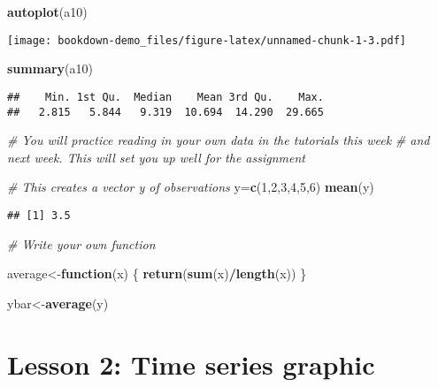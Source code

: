 \documentclass[]{book}
\newenvironment{Shaded}{\begin{snugshade}}{\end{snugshade}}
\newcommand{\CommentTok}[1]{\textcolor[rgb]{0.56,0.35,0.01}{\textit{#1}}}
\newcommand{\ControlFlowTok}[1]{\textcolor[rgb]{0.13,0.29,0.53}{\textbf{#1}}}
\newcommand{\DecValTok}[1]{\textcolor[rgb]{0.00,0.00,0.81}{#1}}
\newcommand{\KeywordTok}[1]{\textcolor[rgb]{0.13,0.29,0.53}{\textbf{#1}}}
\newcommand{\NormalTok}[1]{#1}
\newcommand{\OperatorTok}[1]{\textcolor[rgb]{0.81,0.36,0.00}{\textbf{#1}}}
\begin{document}
\begin{Shaded}
\begin{Highlighting}[]
\KeywordTok{autoplot}\NormalTok{(a10)}
\end{Highlighting}
\end{Shaded}

\texttt{[image: bookdown-demo\_files/figure-latex/unnamed-chunk-1-3.pdf]}

\begin{Shaded}
\begin{Highlighting}[]
\KeywordTok{summary}\NormalTok{(a10)}
\end{Highlighting}
\end{Shaded}

\begin{verbatim}
##    Min. 1st Qu.  Median    Mean 3rd Qu.    Max. 
##   2.815   5.844   9.319  10.694  14.290  29.665
\end{verbatim}

\begin{Shaded}
\begin{Highlighting}[]
\CommentTok{# You will practice reading in your own data in the tutorials this week}
\CommentTok{# and next week. This will set you up well for the assignment}

\CommentTok{# This creates a vector y of observations}
\NormalTok{y=}\KeywordTok{c}\NormalTok{(}\DecValTok{1}\NormalTok{,}\DecValTok{2}\NormalTok{,}\DecValTok{3}\NormalTok{,}\DecValTok{4}\NormalTok{,}\DecValTok{5}\NormalTok{,}\DecValTok{6}\NormalTok{)}
\KeywordTok{mean}\NormalTok{(y)}
\end{Highlighting}
\end{Shaded}

\begin{verbatim}
## [1] 3.5
\end{verbatim}

\begin{Shaded}
\begin{Highlighting}[]
\CommentTok{# Write your own function }

\NormalTok{average<-}\ControlFlowTok{function}\NormalTok{(x)}
\NormalTok{\{}
  \KeywordTok{return}\NormalTok{(}\KeywordTok{sum}\NormalTok{(x)}\OperatorTok{/}\KeywordTok{length}\NormalTok{(x))}
\NormalTok{\}}

\NormalTok{ybar<-}\KeywordTok{average}\NormalTok{(y)}
\end{Highlighting}
\end{Shaded}

\hypertarget{lesson-2-time-series-graphic}{%
\section{Lesson 2: Time series graphic}\label{lesson-2-time-series-graphic}}
\end{document}
